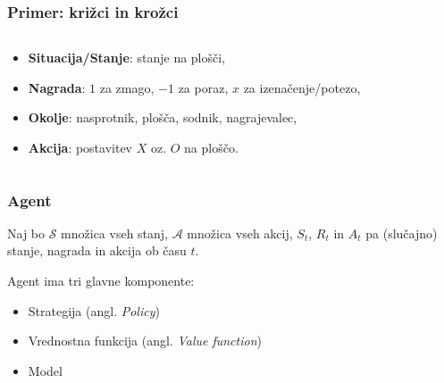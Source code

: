 \documentclass{beamer}    %
\begin{document}
\begin{frame}[fragile]
    \frametitle{Primer: križci in krožci}
    \begin{columns}[T] %
    \begin{column}{.48\textwidth}
    
    \begin{itemize}
        \item \textbf{Situacija/Stanje}: stanje na plošči,
        \item \textbf{Nagrada}: $1$ za zmago, $-1$ za poraz, $x$ za izenačenje/potezo,
        \item \textbf{Okolje}: nasprotnik, plošča, sodnik, nagrajevalec,
        \item \textbf{Akcija}: postavitev $X$ oz. $O$ na ploščo.
    \end{itemize}

    \end{column}%
    \hfill%
    \begin{column}{.48\textwidth}
    

    \end{column}%
    \end{columns}
\end{frame}


\begin{frame}
    \frametitle{Agent}
    Naj bo $\mathcal{S}$ množica vseh stanj, $\mathcal{A}$ množica vseh akcij, $S_t$, $R_t$ in $A_t$ pa 
    (slučajno) stanje, nagrada in akcija ob času $t$. 
    \medskip
    \medskip
    \pause

    Agent ima tri glavne komponente:
    \begin{itemize}
        \item Strategija (angl. \textit{Policy})
        \item Vrednostna funkcija (angl. \textit{Value function})
        \item Model
    \end{itemize}
    \end{frame}
\end{document}

